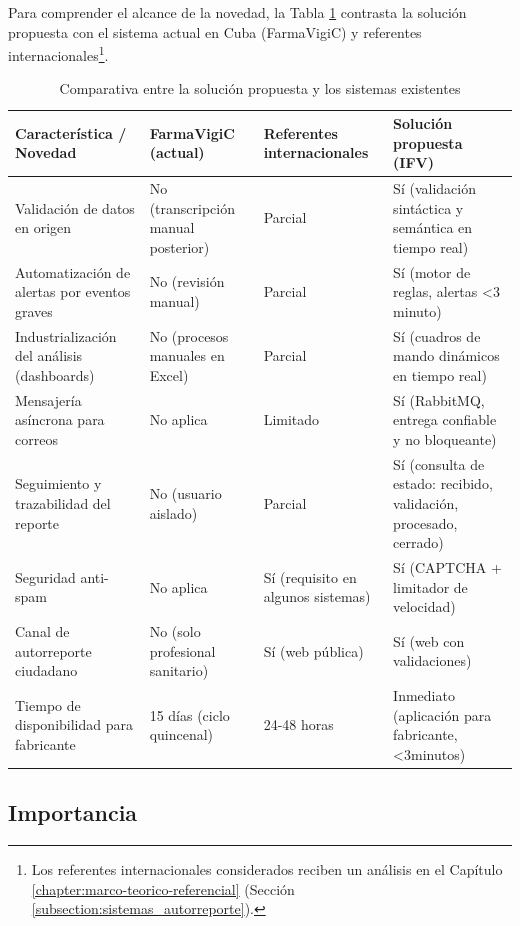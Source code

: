 Para comprender el alcance de la novedad, la Tabla \ref{tab:comparativa_novedad} contrasta la solución propuesta con el sistema actual en Cuba (FarmaVigiC) y referentes internacionales\footnote{Los referentes internacionales considerados reciben un análisis en el Capítulo \ref{chapter:marco-teorico-referencial} (Sección \ref{subsection:sistemas_autorreporte}).}. 


\begin{table}[ht]
    \centering
    \small
    \caption{Comparativa entre la solución propuesta y los sistemas existentes}
    \label{tab:comparativa_novedad}
    \begin{tabular}{|p{3.8cm}|p{3cm}|p{3cm}|p{3.5cm}|}
        \hline
        \textbf{Característica / Novedad} & \textbf{FarmaVigiC (actual)} & \textbf{Referentes internacionales} & \textbf{Solución propuesta (IFV)} \\
        \hline
        Validación de datos en origen & No (transcripción manual posterior) & Parcial & Sí (validación sintáctica y semántica en tiempo real) \\
        \hline
        Automatización de alertas por eventos graves & No (revisión manual) & Parcial & Sí (motor de reglas, alertas <3 minuto) \\
        \hline
        Industrialización del análisis (dashboards) & No (procesos manuales en Excel) & Parcial & Sí (cuadros de mando dinámicos en tiempo real) \\
        \hline
        Mensajería asíncrona para correos & No aplica & Limitado & Sí (RabbitMQ, entrega confiable y no bloqueante) \\
        \hline
        Seguimiento y trazabilidad del reporte & No (usuario aislado) & Parcial & Sí (consulta de estado: recibido, validación, procesado, cerrado) \\
        \hline
        Seguridad anti-spam & No aplica & Sí (requisito en algunos sistemas) & Sí (CAPTCHA + limitador de velocidad) \\
        \hline
        Canal de autorreporte ciudadano & No (solo profesional sanitario) & Sí (web pública) & Sí (web con validaciones) \\
        \hline
        Tiempo de disponibilidad para fabricante & 15 días (ciclo quincenal) & 24-48 horas & Inmediato (aplicación para fabricante, <3minutos) \\
        \hline
    \end{tabular}
\end{table}


\subsection{Importancia}

